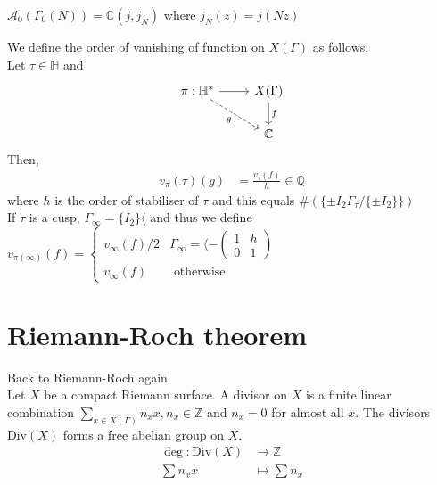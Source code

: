 \documentclass[oneside, 12pt]{scrbook}
\newcommand{\CC}{\mathbb C}
\newcommand{\QQ}{\mathbb Q}
\newcommand{\ZZ}{\mathbb Z}
\newcommand{\HH}{\mathbb{H}}
\theoremstyle{theorem}
\begin{document}
\begin{remark}[Fact]
$\mathcal{A}_{0}(\Gamma_{0}(N)) = \CC(j,j_{N})$ where $j_{N}(z) = j(Nz)$
\end{remark}

We define the order of vanishing of function on $X(\Gamma)$ as follows: \\

Let $\tau \in \HH$ and 
\[\begin{tikzcd}
	{\pi: \mathbb{H}^{*}} & {X(\Gamma)} \\
	& {\mathbb{C}}
	\arrow[from=1-1, to=1-2]
	\arrow["f", from=1-2, to=2-2]
	\arrow["g"', dashed, from=1-1, to=2-2]
\end{tikzcd}\]
Then, 
\begin{eqnarray}
v_{\pi}(\tau) (g) &= \frac{v_{\tau}(f)}{h} \in \QQ
\end{eqnarray}
where $h$ is the order of stabiliser of $\tau$ and this equals $\# (\{\pm I_{2} \Gamma_{\tau}/\{\pm I_{2}\}\})$\\

If $\tau$ is a cusp, $\Gamma_{\infty} = \{I_{2}\} \langle $ and thus we define \\

$v_{\pi (\infty)}(f) = \begin{cases} v_{\infty} (f)/2 & \Gamma_{\infty} = \langle -\begin{pmatrix}
1 & h \\ 0 & 1
\end{pmatrix}  \\ v_{\infty}(f) & \text{ otherwise }\end{cases}$

\section{Riemann-Roch theorem}

Back to Riemann-Roch again. \\

Let $X$ be a compact Riemann surface. A divisor on $X$ is a finite linear combination $\sum_{x \in X(\Gamma)} n_{x}x , n_{x} \in \ZZ$ and $n_{x}=0$ for almost all $x$. The divisors $\mathrm{Div}(X)$ forms a free abelian group on $X$. \\

\begin{eqnarray}
\deg : \mathrm{Div}(X) &\longrightarrow \ZZ \\
\sum n_{x}x &\mapsto \sum n_{x}
\end{eqnarray}
\end{document}

